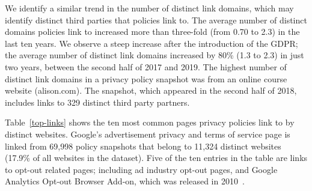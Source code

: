 We identify a similar trend in the number of distinct link domains, which may identify distinct third parties that policies link to. The average number of distinct domains policies link to increased more than three-fold (from 0.70 to 2.3) in the last ten years. %
We observe a steep increase after the introduction of the GDPR; the average number of distinct link domains increased by 80\% (1.3 to 2.3) in just two years, between the second half of 2017 and 2019.
The highest number of distinct link domains in a privacy policy snapshot was from an online course website (alison.com). The snapshot, which appeared in the second half of 2018, includes links to 329 distinct third party partners.


\begin{table}[]
\centering
{}
\caption{Ten most common external links found in privacy policies.\\
*: Google Analytics Opt-out Browser Add-on page.}
\label{top-links}
\end{table}


Table~\ref{top-links} shows the ten most common pages privacy policies link to by distinct websites.
Google’s advertisement privacy and terms of service page is linked from 69,998 policy snapshots that belong
to 11,324 distinct websites (17.9\% of all websites in the dataset).
Five of the ten entries in the table are links to opt-out related pages; including ad industry opt-out pages, and Google Analytics Opt-out Browser Add-on, which was released in 2010~\cite{GA-opt-out}.

